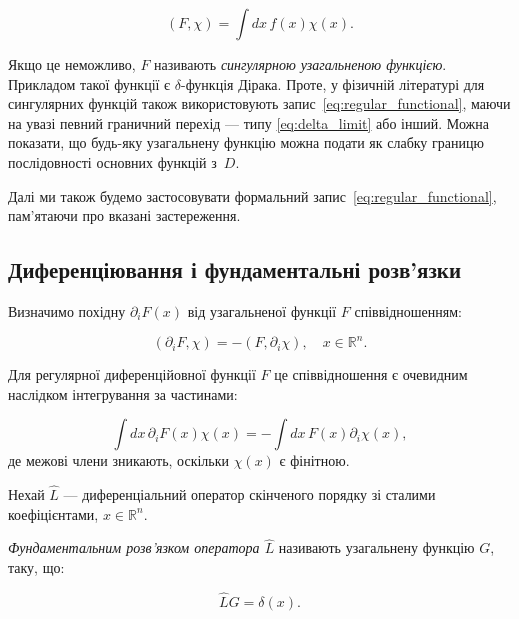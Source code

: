 \begin{equation}\label{eq:regular_functional}
    (F, \chi) = \int dx \, f(x) \chi(x).
\end{equation}

Якщо це неможливо, \( F \) називають \textit{сингулярною узагальненою функцією}. Прикладом такої функції є \(\delta\)-функція Дірака. Проте, у
фізичній літературі для сингулярних функцій також використовують запис~\eqref{eq:regular_functional}, маючи на увазі певний граничний перехід --- типу
\eqref{eq:delta_limit} або інший. Можна показати, що будь-яку узагальнену функцію можна подати як слабку границю послідовності основних функцій з~\( D
\).

Далі ми також будемо застосовувати формальний запис~\eqref{eq:regular_functional}, пам'ятаючи про вказані застереження.

\subsection{Диференціювання і фундаментальні розв'язки}

Визначимо похідну \( \partial_i F(x) \) від узагальненої функції \( F \) співвідношенням:

\begin{equation}\label{eq:derivative_definition}
    (\partial_i F, \chi) = - (F, \partial_i \chi), \quad x \in \mathbb{R}^n.
\end{equation}

Для регулярної диференційовної функції \( F \) це співвідношення є очевидним наслідком інтегрування за частинами:

\begin{equation*}
    \int dx \, \partial_i F(x) \chi(x) = - \int dx \, F(x) \partial_i \chi(x),
\end{equation*}
де межові члени зникають, оскільки \( \chi(x) \) є фінітною.

Нехай \( \hat{L} \) --- диференціальний оператор скінченого порядку зі сталими коефіцієнтами, \( x \in \mathbb{R}^n \).

\emph{Фундаментальним розв'язком оператора \( \hat{L} \)} називають узагальнену функцію \( G \), таку, що:

\begin{equation}\label{eq:fundamental_solution}
    \hat{L} G = \delta(x).
\end{equation}

